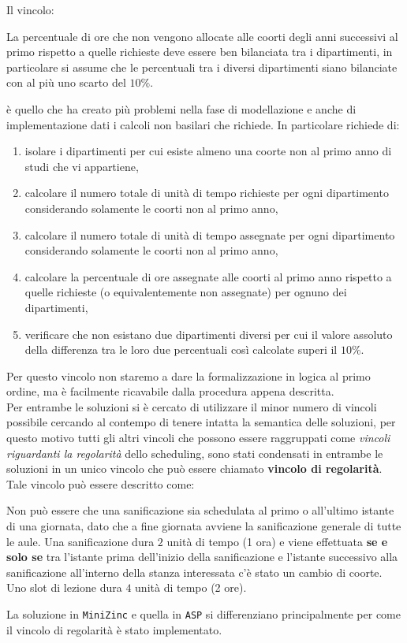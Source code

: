 \documentclass[12pt, italian, openany]{book}
\begin{document}
Il vincolo:
\begin{tcolorbox}[title=\textbf{Vincolo bilanciamento insoddisfazione dipartimenti}]
La percentuale di ore che non vengono allocate alle coorti degli anni successivi al primo rispetto a quelle richieste deve essere ben bilanciata tra i dipartimenti, in particolare si assume che le percentuali tra i diversi dipartimenti siano bilanciate con al più uno scarto del $10 \% $.
\end{tcolorbox}
è quello che ha creato più problemi nella fase di modellazione e anche di implementazione dati i calcoli non basilari che richiede.
In particolare richiede di:
\begin{enumerate}
\item isolare i dipartimenti per cui esiste almeno una coorte non al primo anno di studi che vi appartiene,
\item calcolare il numero totale di unità di tempo richieste per ogni dipartimento considerando solamente le coorti non al primo anno,
\item calcolare il numero totale di unità di tempo assegnate per ogni dipartimento considerando solamente le coorti non al primo anno,
\item calcolare la percentuale di ore assegnate alle coorti al primo anno rispetto a quelle richieste (o equivalentemente non assegnate) per ognuno dei dipartimenti,
\item verificare che non esistano due dipartimenti diversi per cui il valore assoluto della differenza tra le loro due percentuali così calcolate superi il $10 \%$.
\end{enumerate}
Per questo vincolo non staremo a dare la formalizzazione in logica al primo ordine, ma è facilmente ricavabile dalla procedura appena descritta.\\

Per entrambe le soluzioni si è cercato di utilizzare il minor numero di vincoli possibile cercando al contempo di tenere intatta la semantica delle soluzioni, per questo motivo tutti gli altri vincoli che possono essere raggruppati come \textit{vincoli riguardanti la regolarità} dello scheduling, sono stati condensati in entrambe le soluzioni in un unico vincolo che può essere chiamato \textbf{vincolo di regolarità}.
Tale vincolo può essere descritto come:
\begin{tcolorbox}[title=\textbf{Vincolo di regolarità}]\label{reg}
Non può essere che una sanificazione sia schedulata al primo o all'ultimo istante di una giornata, dato che a fine giornata avviene la sanificazione generale di tutte le aule. Una sanificazione dura $2$ unità di tempo (1 ora) e viene effettuata \textbf{se e solo se} tra l'istante prima dell'inizio della sanificazione e l'istante successivo alla sanificazione all'interno della stanza interessata c'è stato un cambio di coorte. Uno slot di lezione dura $4$ unità di tempo (2 ore).
\end{tcolorbox}
La soluzione in \texttt{MiniZinc} e quella in \texttt{ASP} si differenziano principalmente per come il vincolo di regolarità è stato implementato.
\end{document}
